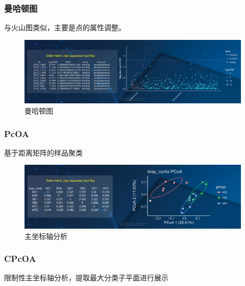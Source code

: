 \documentclass[]{article}
\numberwithin{figure}{section}
\numberwithin{table}{section}
\theoremstyle{definition}
\theoremstyle{definition}
\theoremstyle{definition}
\theoremstyle{remark}
\begin{document}
\subsubsection{曼哈顿图}

与火山图类似，主要是点的属性调整。

\begin{figure}[H]

{\centering \includegraphics[width=0.95\linewidth,height=0.7\textheight,keepaspectratio]{images/mhd} 

}

\caption{曼哈顿图}\label{fig:unnamed-chunk-266}
\end{figure}

\subsubsection{PcOA}\label{pcoa}

基于距离矩阵的样品聚类

\begin{figure}[H]

{\centering \includegraphics[width=0.95\linewidth,height=0.7\textheight,keepaspectratio]{images/PcOA} 

}

\caption{主坐标轴分析}\label{fig:unnamed-chunk-267}
\end{figure}

\subsubsection{CPcOA}\label{cpcoa}

限制性主坐标轴分析，提取最大分类子平面进行展示
\end{document}
